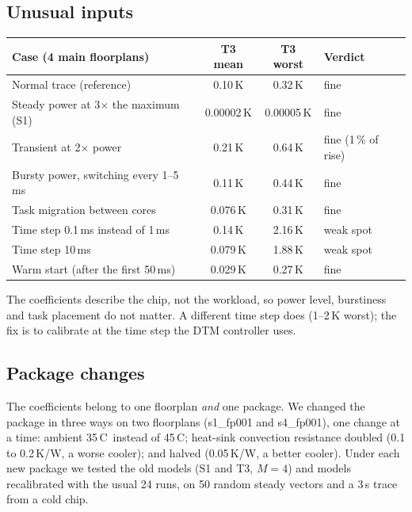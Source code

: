 \documentclass[11pt,a4paper]{article}
\newcommand{\degC}{\,\textdegree C}
\begin{document}
\subsection{Unusual inputs}
\begin{center}
\small
\begin{tabular}{@{}l c c l@{}}
\toprule
Case (4 main floorplans) & T3 mean & T3 worst & Verdict \\
\midrule
Normal trace (reference) & 0.10\,K & 0.32\,K & fine \\
Steady power at 3$\times$ the maximum (S1) & 0.00002\,K & 0.00005\,K & fine \\
Transient at 2$\times$ power & 0.21\,K & 0.64\,K & fine (1\,\% of rise) \\
Bursty power, switching every 1--5\,ms & 0.11\,K & 0.44\,K & fine \\
Task migration between cores & 0.076\,K & 0.31\,K & fine \\
Time step 0.1\,ms instead of 1\,ms & 0.14\,K & 2.16\,K & weak spot \\
Time step 10\,ms & 0.079\,K & 1.88\,K & weak spot \\
Warm start (after the first 50\,ms) & 0.029\,K & 0.27\,K & fine \\
\bottomrule
\end{tabular}
\end{center}
The coefficients describe the chip, not the workload, so power level, burstiness and task
placement do not matter. A different time step does (1--2\,K worst); the fix is to calibrate at
the time step the DTM controller uses.

\subsection{Package changes}
The coefficients belong to one floorplan \emph{and} one package. We changed the package in three
ways on two floorplans (s1\_fp001 and s4\_fp001), one change at a time: ambient 35\degC\ instead of
45\degC; heat-sink convection resistance doubled (0.1 to 0.2\,K/W, a worse cooler); and halved
(0.05\,K/W, a better cooler). Under each new package we tested the old models (S1 and T3, $M=4$)
and models recalibrated with the usual 24 runs, on 50 random steady vectors and a 3\,s trace from
a cold chip.
\end{document}
